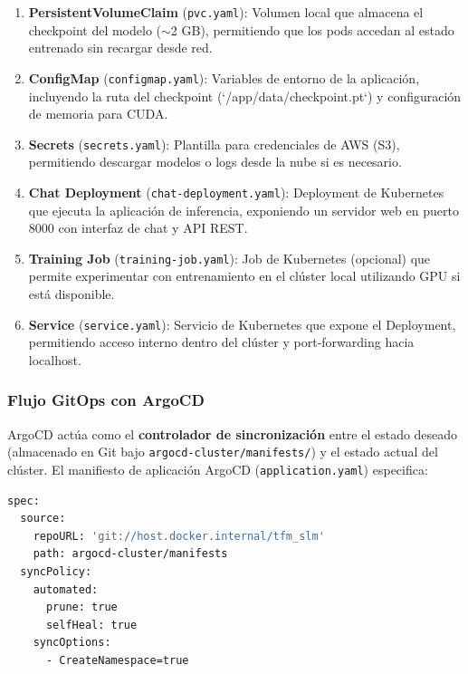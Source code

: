 \begin{enumerate}
    \item \textbf{PersistentVolumeClaim} (\texttt{pvc.yaml}): Volumen local que almacena el checkpoint del modelo ($\sim$2 GB), permitiendo que los pods accedan al estado entrenado sin recargar desde red.

    \item \textbf{ConfigMap} (\texttt{configmap.yaml}): Variables de entorno de la aplicación, incluyendo la ruta del checkpoint (`/app/data/checkpoint.pt`) y configuración de memoria para CUDA.

    \item \textbf{Secrets} (\texttt{secrets.yaml}): Plantilla para credenciales de AWS (S3), permitiendo descargar modelos o logs desde la nube si es necesario.

    \item \textbf{Chat Deployment} (\texttt{chat-deployment.yaml}): Deployment de Kubernetes que ejecuta la aplicación de inferencia, exponiendo un servidor web en puerto 8000 con interfaz de chat y API REST.

    \item \textbf{Training Job} (\texttt{training-job.yaml}): Job de Kubernetes (opcional) que permite experimentar con entrenamiento en el clúster local utilizando GPU si está disponible.

    \item \textbf{Service} (\texttt{service.yaml}): Servicio de Kubernetes que expone el Deployment, permitiendo acceso interno dentro del clúster y port-forwarding hacia localhost.
\end{enumerate}

\subsubsection{Flujo GitOps con ArgoCD}

ArgoCD actúa como el \textbf{controlador de sincronización} entre el estado deseado (almacenado en Git bajo \texttt{argocd-cluster/manifests/}) y el estado actual del clúster. El manifiesto de aplicación ArgoCD (\texttt{application.yaml}) especifica:

\begin{lstlisting}[language=bash, caption={Configuración de sincronización GitOps en ArgoCD.}]
spec:
  source:
    repoURL: 'git://host.docker.internal/tfm_slm'
    path: argocd-cluster/manifests
  syncPolicy:
    automated:
      prune: true
      selfHeal: true
    syncOptions:
      - CreateNamespace=true
\end{lstlisting}


